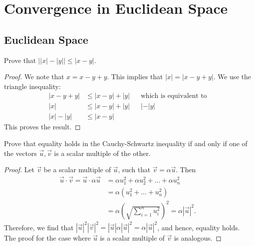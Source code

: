 \documentclass[12pt]{book}
\newenvironment{exercise}[2][Exercise]{\begin{trivlist}
\item[\hskip \labelsep {\bfseries #1}\hskip \labelsep {\bfseries #2.}]}{\end{trivlist}}
\begin{document}



\chapter{Convergence in Euclidean Space}
\section{Euclidean Space}


\begin{exercise}{7.1.5}
Prove that $\left| |x| - |y| \right| \leq \left| x- y \right|$.

    \begin{proof}
    We note that $x = x-y+y$. This implies that $\left|x\right| = \left| x - y + y\right| $. We use the triangle inequality:\
        \begin{align*}
        \left| x - y + y \right| &\leq \left|x-y\right| + |y| &&\text{which is equivalent to}\\
        \left| x \right| &\leq \left|x-y\right| + |y| &&| - |y| \\
        \left| x \right| - \left| y \right| &\leq \left| x- y \right|
        \end{align*}
    This proves the result.
    \end{proof}
\end{exercise}


\begin{exercise}{7.1.6}
Prove that equality holds in the Cauchy-Schwartz inequality if and only if one of the vectors $\vec{u}, \vec{v}$ is a scalar multiple of the other.
    
    \begin{proof}
    Let $\vec{v}$ be a scalar multiple of $\vec{u}$, such that $\vec{v} = \alpha \vec{u}$. Then 
        \begin{align*}
        \vec{u} \cdot \vec{v} = \vec{u} \cdot \alpha \vec{u} &= \alpha u_1^2 + \alpha u_2^2 + \hdots + \alpha u_n^2 \\
         &= \alpha \left( u_1^2 + \hdots + u_n^2 \right) \\
         &= \alpha \left( \sqrt{ \sum_{i=1}^n u_i^2 } \right)^2 = \alpha \left| \vec{u} \right| ^2.
        \end{align*}
    Therefore, we find that $\left| \vec{u} \right|^2 \left|\vec{v}\right|^2 = \left|\vec{u}\right| \alpha \left|\vec{u}\right|^2= \alpha \left| \vec{u} \right|^2$, and hence, equality holds. The proof for the case where $\vec{u}$ is a scalar multiple of $\vec{v}$ is analogous.
    \end{proof}
\end{exercise} 
\end{document}
